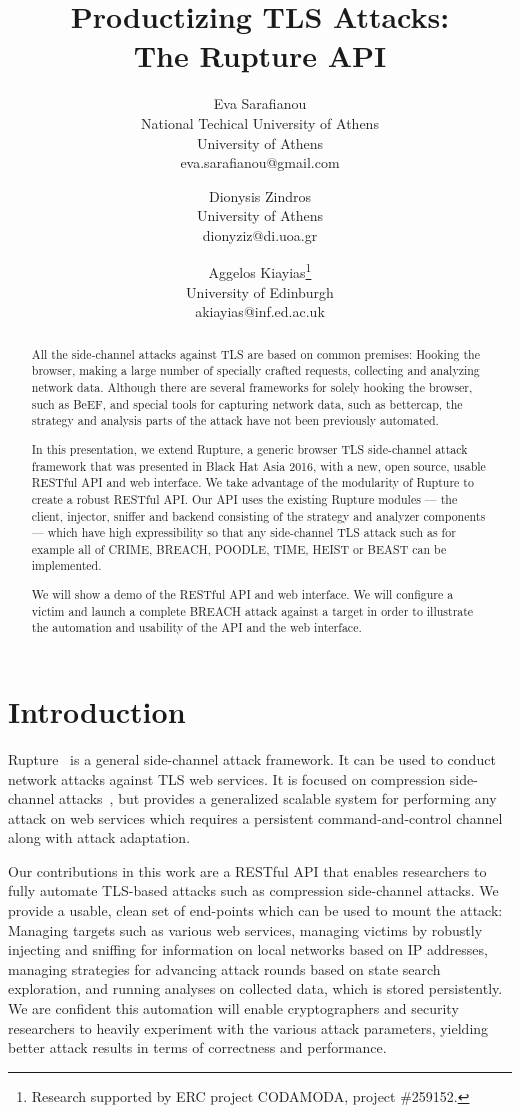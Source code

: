 \documentclass[a4paper, 11 pt, conference]{article}
\title{\textbf{Productizing TLS Attacks:} \\
	 \textbf{The Rupture API}}
\author{
	Eva Sarafianou\footnotemark[1]\\
	National Techical University of Athens\\
	University of Athens\\
	eva.sarafianou@gmail.com\\
	\and
	Dionysis Zindros\footnotemark[1]\\
	University of Athens\\
	dionyziz@di.uoa.gr\\
	\and
	Aggelos Kiayias\thanks{Research supported by ERC project CODAMODA, project \#259152.}\\
	University of Edinburgh\\
	akiayias@inf.ed.ac.uk\\
	}
\date{}
\begin{document}
	
\maketitle
	
\begin{abstract}
All the side-channel attacks against TLS are based on common premises: Hooking the browser, making a large number of specially crafted requests, collecting and analyzing network data. Although there are several frameworks for solely hooking the browser, such as BeEF, and special tools for capturing network data, such as bettercap, the strategy and analysis parts of the attack have not been previously automated. 
	
In this presentation, we extend Rupture, a generic browser TLS side-channel attack framework that was presented in Black Hat Asia 2016, with a new, open source, usable RESTful API and web interface. We take advantage of the modularity of Rupture to create a robust RESTful API. Our API uses the existing Rupture modules --- the client, injector, sniffer and backend consisting of the strategy and analyzer components --- which have high expressibility so that any side-channel TLS attack such as for example all of CRIME, BREACH, POODLE, TIME, HEIST or BEAST can be implemented.

We will show a demo of the RESTful API and web interface. We will configure a victim and launch a complete BREACH attack against a target in order to illustrate the automation and usability of the API and the web interface.
\end{abstract}
	
\section{Introduction}
	Rupture~\cite{c15} is a general side-channel attack framework. It can be used to conduct network attacks against TLS web services. It is focused on compression side-channel attacks~\cite{c17}, but provides a generalized scalable system for performing any attack on web services which requires a persistent command-and-control channel along with attack adaptation.
	
	Our contributions in this work are a RESTful API that enables researchers to
	fully automate TLS-based attacks such as compression side-channel attacks. We
	provide a usable, clean set of end-points which can be used to mount the
	attack: Managing targets such as various web services, managing victims by
	robustly injecting and sniffing for information on local networks based on IP
	addresses, managing strategies for advancing attack rounds based on state
	search exploration, and running analyses on collected data, which is stored
	persistently. We are confident this automation will enable cryptographers and
	security researchers to heavily experiment with the various attack parameters,
	yielding better attack results in terms of correctness and performance.
	
\end{document}
